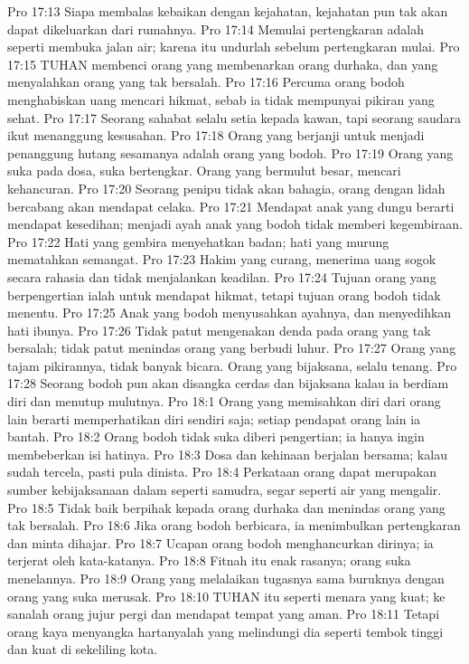 Pro 17:13  Siapa membalas kebaikan dengan kejahatan, kejahatan pun tak akan dapat dikeluarkan dari rumahnya.
Pro 17:14  Memulai pertengkaran adalah seperti membuka jalan air; karena itu undurlah sebelum pertengkaran mulai.
Pro 17:15  TUHAN membenci orang yang membenarkan orang durhaka, dan yang menyalahkan orang yang tak bersalah.
Pro 17:16  Percuma orang bodoh menghabiskan uang mencari hikmat, sebab ia tidak mempunyai pikiran yang sehat.
Pro 17:17  Seorang sahabat selalu setia kepada kawan, tapi seorang saudara ikut menanggung kesusahan.
Pro 17:18  Orang yang berjanji untuk menjadi penanggung hutang sesamanya adalah orang yang bodoh.
Pro 17:19  Orang yang suka pada dosa, suka bertengkar. Orang yang bermulut besar, mencari kehancuran.
Pro 17:20  Seorang penipu tidak akan bahagia, orang dengan lidah bercabang akan mendapat celaka.
Pro 17:21  Mendapat anak yang dungu berarti mendapat kesedihan; menjadi ayah anak yang bodoh tidak memberi kegembiraan.
Pro 17:22  Hati yang gembira menyehatkan badan; hati yang murung mematahkan semangat.
Pro 17:23  Hakim yang curang, menerima uang sogok secara rahasia dan tidak menjalankan keadilan.
Pro 17:24  Tujuan orang yang berpengertian ialah untuk mendapat hikmat, tetapi tujuan orang bodoh tidak menentu.
Pro 17:25  Anak yang bodoh menyusahkan ayahnya, dan menyedihkan hati ibunya.
Pro 17:26  Tidak patut mengenakan denda pada orang yang tak bersalah; tidak patut menindas orang yang berbudi luhur.
Pro 17:27  Orang yang tajam pikirannya, tidak banyak bicara. Orang yang bijaksana, selalu tenang.
Pro 17:28  Seorang bodoh pun akan disangka cerdas dan bijaksana kalau ia berdiam diri dan menutup mulutnya.
Pro 18:1  Orang yang memisahkan diri dari orang lain berarti memperhatikan diri sendiri saja; setiap pendapat orang lain ia bantah.
Pro 18:2  Orang bodoh tidak suka diberi pengertian; ia hanya ingin membeberkan isi hatinya.
Pro 18:3  Dosa dan kehinaan berjalan bersama; kalau sudah tercela, pasti pula dinista.
Pro 18:4  Perkataan orang dapat merupakan sumber kebijaksanaan dalam seperti samudra, segar seperti air yang mengalir.
Pro 18:5  Tidak baik berpihak kepada orang durhaka dan menindas orang yang tak bersalah.
Pro 18:6  Jika orang bodoh berbicara, ia menimbulkan pertengkaran dan minta dihajar.
Pro 18:7  Ucapan orang bodoh menghancurkan dirinya; ia terjerat oleh kata-katanya.
Pro 18:8  Fitnah itu enak rasanya; orang suka menelannya.
Pro 18:9  Orang yang melalaikan tugasnya sama buruknya dengan orang yang suka merusak.
Pro 18:10  TUHAN itu seperti menara yang kuat; ke sanalah orang jujur pergi dan mendapat tempat yang aman.
Pro 18:11  Tetapi orang kaya menyangka hartanyalah yang melindungi dia seperti tembok tinggi dan kuat di sekeliling kota.
